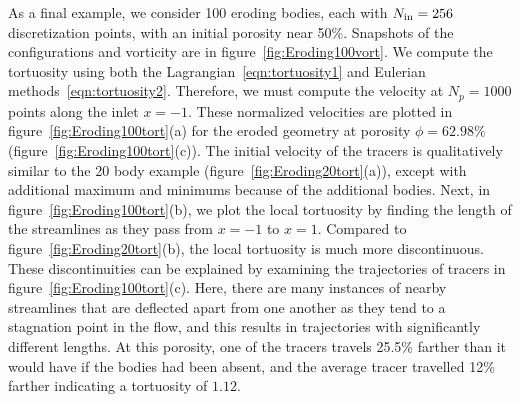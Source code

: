 \documentclass{jfm}
\begin{document}
As a final example, we consider 100 eroding bodies, each with
$N_{\mathrm{in}}=256$ discretization points, with an initial porosity near 50\%.
Snapshots of the configurations and vorticity are in
figure~\ref{fig:Eroding100vort}. We compute the tortuosity using both
the Lagrangian~\eqref{eqn:tortuosity1} and Eulerian
methods~\eqref{eqn:tortuosity2}. Therefore, we must compute the velocity
at $N_p = 1000$ points along the inlet $x=-1$. These normalized
velocities are plotted in figure~\ref{fig:Eroding100tort}(a) for the
eroded geometry at porosity $\phi = 62.98\%$
(figure~\ref{fig:Eroding100tort}(c)).  The initial velocity of the
tracers is qualitatively similar to the 20 body example
(figure~\ref{fig:Eroding20tort}(a)), except with additional maximum and
minimums because of the additional bodies.  Next, in
figure~\ref{fig:Eroding100tort}(b), we plot the local tortuosity by
finding the length of the streamlines as they pass from $x=-1$ to $x=1$.
Compared to figure~\ref{fig:Eroding20tort}(b), the local tortuosity is
much more discontinuous.  These discontinuities can be explained by
examining the trajectories of tracers in
figure~\ref{fig:Eroding100tort}(c).  Here, there are many instances of
nearby streamlines that are deflected apart from one another as they
tend to a stagnation point in the flow, and this results in trajectories
with significantly different lengths.  At this porosity, one of the
tracers travels 25.5\% farther than it would have if the bodies had been
absent, and the average tracer travelled 12\% farther indicating a
tortuosity of $1.12$.
\end{document}
